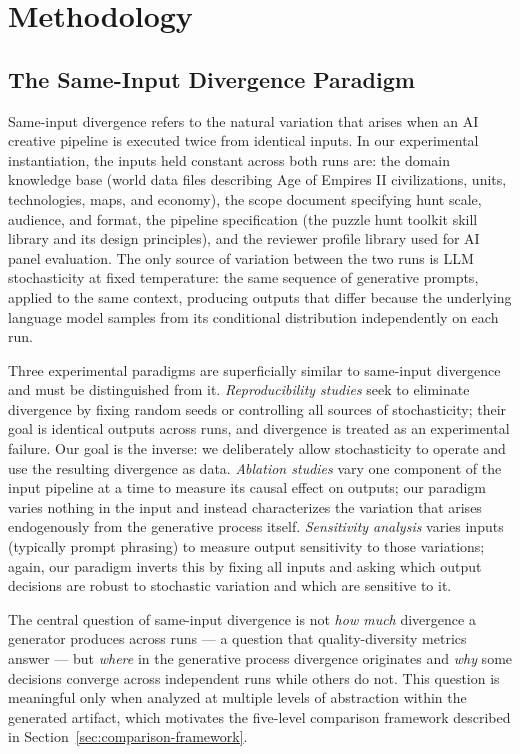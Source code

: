 \section{Methodology}

\subsection{The Same-Input Divergence Paradigm}

Same-input divergence refers to the natural variation that arises when an AI creative pipeline is executed twice from identical inputs. In our experimental instantiation, the inputs held constant across both runs are: the domain knowledge base (world data files describing Age of Empires II civilizations, units, technologies, maps, and economy), the scope document specifying hunt scale, audience, and format, the pipeline specification (the puzzle hunt toolkit skill library and its design principles), and the reviewer profile library used for AI panel evaluation. The only source of variation between the two runs is LLM stochasticity at fixed temperature: the same sequence of generative prompts, applied to the same context, producing outputs that differ because the underlying language model samples from its conditional distribution independently on each run.

Three experimental paradigms are superficially similar to same-input divergence and must be distinguished from it. \textit{Reproducibility studies} \citep{pineau2021improving} seek to eliminate divergence by fixing random seeds or controlling all sources of stochasticity; their goal is identical outputs across runs, and divergence is treated as an experimental failure. Our goal is the inverse: we deliberately allow stochasticity to operate and use the resulting divergence as data. \textit{Ablation studies} vary one component of the input pipeline at a time to measure its causal effect on outputs; our paradigm varies nothing in the input and instead characterizes the variation that arises endogenously from the generative process itself. \textit{Sensitivity analysis} \citep{jiang2020can,zhao2021calibrate} varies inputs (typically prompt phrasing) to measure output sensitivity to those variations; again, our paradigm inverts this by fixing all inputs and asking which output decisions are robust to stochastic variation and which are sensitive to it.

The central question of same-input divergence is not \textit{how much} divergence a generator produces across runs --- a question that quality-diversity metrics answer --- but \textit{where} in the generative process divergence originates and \textit{why} some decisions converge across independent runs while others do not. This question is meaningful only when analyzed at multiple levels of abstraction within the generated artifact, which motivates the five-level comparison framework described in Section~\ref{sec:comparison-framework}.

